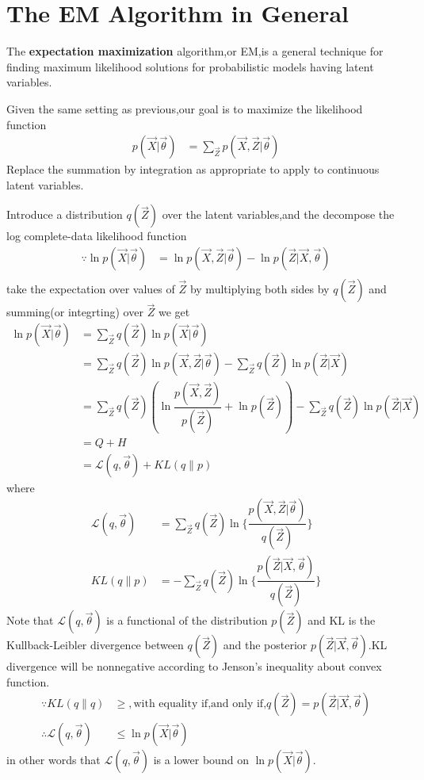 \section{The EM Algorithm in General}
The \textbf{expectation maximization} algorithm,or EM,is a general technique for finding maximum likelihood solutions for probabilistic models having latent variables.

Given the same setting as previous,our goal is to maximize the likelihood function
\begin{align}
p(\vec{X}|\vec{\theta}) &=\sum_{\vec{Z}}p(\vec{X},\vec{Z}|\vec{\theta}) 
\end{align}
Replace the summation by integration as appropriate to apply to continuous latent variables.

Introduce a distribution $q(\vec{Z})$ over the latent variables,and the decompose the log complete-data likelihood function
\begin{align}
\because \ln p(\vec{X}|\vec{\theta}) &=\ln p(\vec{X},\vec{Z}|\vec{\theta}) -\ln p(\vec{Z}|\vec{X},\vec{\theta}) \\
\end{align}
take the expectation over values of $\vec{Z}$ by multiplying both sides by $q(\vec{Z})$ and summing(or integrting) over $\vec{Z}$ we get
\begin{align}
\ln p(\vec{X}|\vec{\theta}) 
&=\sum_{\vec{Z}}q(\vec{Z})\ln p(\vec{X}|\vec{\theta}) \\
&=\sum_{\vec{Z}}q(\vec{Z})\ln p(\vec{X},\vec{Z}|\vec{\theta})-\sum_{\vec{Z}}q(\vec{Z})\ln p(\vec{Z}|\vec{X}) \\
&=\sum_{\vec{Z}}q(\vec{Z})(\ln \dfrac {p(\vec{X},\vec{Z})}{p(\vec{Z})}+\ln p(\vec{Z}))-\sum_{\vec{Z}}q(\vec{Z})\ln p(\vec{Z}|\vec{X}) \\
&=Q+H \\
&=\mathcal{L}(q,\vec{\theta})+KL(q\parallel p)
\end{align}
where
\begin{align}\label{eqn:complete-data log likelihood decomposition}
\mathcal{L}(q,\vec{\theta})
&=\sum_{\vec{Z}}q(\vec{Z})\ln
\{\dfrac{p(\vec{X},\vec{Z}|\vec{\theta})}{q(\vec{Z})} \} \\
KL(q\parallel p)
&=-\sum_{\vec{Z}}{q(\vec{Z})\ln
	\{\dfrac{p(\vec{Z}|\vec{X},\vec{\theta})}
		 {q(\vec{Z})}\}}
\end{align}
Note that $\mathcal{L}(q,\vec{\theta})$ is a functional of the distribution $p(\vec{Z})$ and KL is the Kullback-Leibler divergence between $q(\vec{Z})$ and the posterior $p(\vec{Z}|\vec{X},\vec{\theta})$.KL divergence will be nonnegative according to Jenson's inequality about convex function.
\begin{align}
\because KL(q\parallel q)&\geq,\text{with equality if,and only if,}q(\vec{Z})=p(\vec{Z}|\vec{X},\vec{\theta})\\
\therefore
\mathcal{L}	(q,\vec{\theta})&\leq\ln p(\vec{X}|\vec{\theta})
\end{align}
in other words that $\mathcal{L}(q,\vec{\theta})$ is a lower bound on $\ln p(\vec{X}|\vec{\theta})$.

